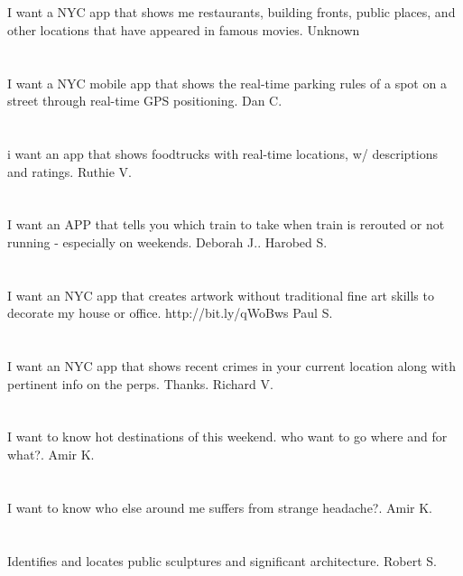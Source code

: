 \section{}I want a NYC app that shows me restaurants,  building fronts,  public places,  and other locations that have appeared in famous movies. Unknown
\section{}I want a NYC mobile app that shows the real-time parking rules of a spot on a street through real-time GPS positioning. Dan C.
\section{}i want an app that shows foodtrucks with real-time locations,  w/ descriptions and ratings. Ruthie V.
\section{}I want an APP that tells you which train to take when train is rerouted or not running - especially on weekends. Deborah J.. Harobed S.
\section{}I want an NYC app that creates artwork without traditional fine art skills to decorate my house or office. http://bit.ly/qWoBws  Paul S.
\section{}I want an NYC app that shows recent crimes in your current location along with pertinent info on the perps. Thanks.  Richard V.
\section{}I want to know hot destinations of this weekend. who want to go where and for what?. Amir K.
\section{}I want to know who else around me suffers from strange headache?. Amir K.
\section{}Identifies and locates public sculptures and significant architecture. Robert S.
